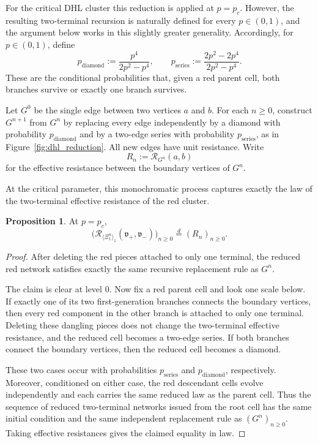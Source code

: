 \documentclass{article}
\theoremstyle{plain}
\theoremstyle{definition}
\newtheorem{proposition}[theorem]{Proposition}
\newcommand{\Reff}{\mathscr{R}}
\begin{document}
For the critical DHL cluster this reduction is applied at $p=p_c$.
However, the resulting two-terminal recursion is naturally defined for every $p\in(0,1)$, and the argument below works in this slightly greater generality.
Accordingly, for $p\in(0,1)$, define
\[
p_{\mathrm{diamond}}:=\frac{p^4}{2p^2-p^4},
\qquad
p_{\mathrm{series}}:=\frac{2p^2-2p^4}{2p^2-p^4}.
\]
These are the conditional probabilities that, given a red parent cell, both branches survive or exactly one branch survives.

Let $G^0$ be the single edge between two vertices $a$ and $b$.
For each $n\ge 0$, construct $G^{n+1}$ from $G^n$ by replacing every edge independently by a diamond with probability $p_{\mathrm{diamond}}$ and by a two-edge series with probability $p_{\mathrm{series}}$, as in Figure~\ref{fig:dhl_reduction}.
All new edges have unit resistance.
Write
\[
R_n:=\Reff_{G^n}(a,b)
\]
for the effective resistance between the boundary vertices of $G^n$.

At the critical parameter, this monochromatic process captures exactly the law of the two-terminal effective resistance of the red cluster.

\begin{proposition}\label{prop:dhl_reduction}
At $p=p_c$,
\[
\bigl(\Reff_{\langle \Xi_1^n\rangle_1}(\mathfrak v_+,\mathfrak v_-)\bigr)_{n\ge 0}
\stackrel{d}{=}
(R_n)_{n\ge 0}.
\]
\end{proposition}

\begin{proof}
 
After deleting the red pieces attached to only one terminal, the reduced red network satisfies exactly the same recursive replacement rule as $G^n$.

The claim is clear at level $0$.
Now fix a red parent cell and look one scale below.
If exactly one of its two first-generation branches connects the boundary vertices, then every red component in the other branch is attached to only one terminal.
Deleting these dangling pieces does not change the two-terminal effective resistance, and the reduced cell becomes a two-edge series.
If both branches connect the boundary vertices, then the reduced cell becomes a diamond.

These two cases occur with probabilities $p_{\mathrm{series}}$ and $p_{\mathrm{diamond}}$, respectively.
Moreover, conditioned on either case, the red descendant cells evolve independently and each carries the same reduced law as the parent cell.
Thus the sequence of reduced two-terminal networks issued from the root cell has the same initial condition and the same independent replacement rule as $(G^n)_{n\ge 0}$.
Taking effective resistances gives the claimed equality in law.
\end{proof}
\end{document}
